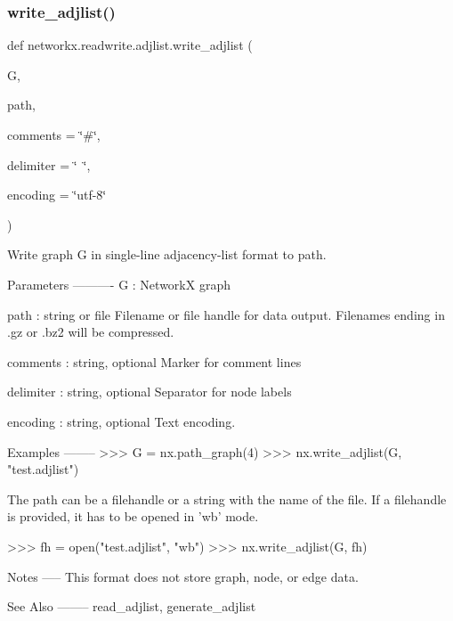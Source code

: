 \subsubsection{\texorpdfstring{write\+\_\+adjlist()}{write\_adjlist()}}
{\footnotesize\ttfamily def networkx.\+readwrite.\+adjlist.\+write\+\_\+adjlist (\begin{DoxyParamCaption}\item[{}]{G,  }\item[{}]{path,  }\item[{}]{comments = {\ttfamily \char`\"{}\#\char`\"{}},  }\item[{}]{delimiter = {\ttfamily \char`\"{}~\char`\"{}},  }\item[{}]{encoding = {\ttfamily \char`\"{}utf-\/8\char`\"{}} }\end{DoxyParamCaption})}

\begin{DoxyVerb}Write graph G in single-line adjacency-list format to path.


Parameters
----------
G : NetworkX graph

path : string or file
   Filename or file handle for data output.
   Filenames ending in .gz or .bz2 will be compressed.

comments : string, optional
   Marker for comment lines

delimiter : string, optional
   Separator for node labels

encoding : string, optional
   Text encoding.

Examples
--------
>>> G = nx.path_graph(4)
>>> nx.write_adjlist(G, "test.adjlist")

The path can be a filehandle or a string with the name of the file. If a
filehandle is provided, it has to be opened in 'wb' mode.

>>> fh = open("test.adjlist", "wb")
>>> nx.write_adjlist(G, fh)

Notes
-----
This format does not store graph, node, or edge data.

See Also
--------
read_adjlist, generate_adjlist
\end{DoxyVerb}
 